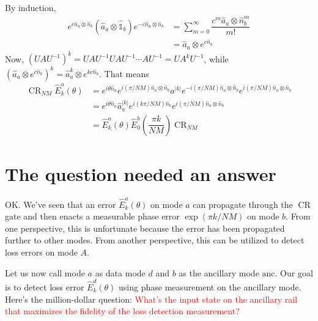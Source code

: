 \documentclass{article}
\DeclareMathOperator{\CR}{\text{CR}}
\begin{document}
By induction, 
\begin{align}
    e^{c\hat{n}_a\otimes\hat{n}_b}(\hat{a}_a\otimes \hat{\mathbb{1}}_b)e^{-c\hat{n}_a\otimes\hat{n}_b}&=\sum_{m=0}^\infty \dfrac{c^m \hat{a}_a\otimes \hat{n}_b^m}{m!}\\
    &=\hat{a}_a\otimes e^{c\hat{n}_b}
\end{align}
Now, $(UAU^{-1})^{k}=UAU^{-1}UAU^{-1}\cdots AU^{-1}=UA^{k}U^{-1}$, while $(\hat{a}_a\otimes e^{c\hat{n}_b})^k=\hat{a}^{k}_a\otimes e^{kc\hat{n}_b}$. That means
\begin{align}
\CR_{NM}\hat{E}_k^a(\theta)&=e^{i\theta\hat{n}_a}e^{i(\pi/NM)\hat{n}_a\otimes \hat{n}_b}a^{|k|}e^{-i(\pi/NM)\hat{n}_a\otimes \hat{n}_b}e^{i(\pi/NM)\hat{n}_a\otimes \hat{n}_b}\\
&=e^{i\theta\hat{n}_a}\hat{a}_a^{|k|}e^{i(k\pi/NM)\hat{n}_b}e^{i(\pi/NM)\hat{n}_a\otimes\hat{n}_b}\\
&=\hat{E}_k^a(\theta)\hat{E}_0^b\left(\dfrac{\pi k}{NM}\right)\CR_{NM}
\end{align}
\section{The question needed an answer}
OK. We've seen that an error $\hat{E}_k^a(\theta)$ on mode $a$ can propagate through the $\CR$ gate and then enacts a measurable phase error $\exp(\pi k/NM)$ on mode $b$. From one perspective, this is unfortunate because the error has been propagated further to other modes. From another perspective, this can be utilized to detect loss errors on mode $A$.

Let us now call mode $a$ as data mode $d$ and $b$ as the ancillary mode $\text{anc}$. Our goal is to detect loss error $\hat{E}_k^d(\theta)$ using phase measurement on the ancillary mode. Here's the million-dollar question: \textcolor{red}{What's the input state on the ancillary rail that maximizes the fidelity of the loss detection measurement?}
\end{document}
